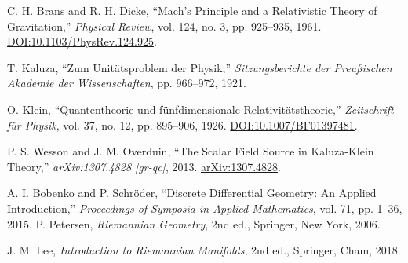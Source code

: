 \documentclass[twoside,twocolumn]{article}
\begin{document}
\begin{thebibliography}{99}
C. H. Brans and R. H. Dicke,
``Mach's Principle and a Relativistic Theory of Gravitation,''
\textit{Physical Review}, vol. 124, no. 3, pp. 925--935, 1961.
\href{https://doi.org/10.1103/PhysRev.124.925}{DOI:10.1103/PhysRev.124.925}.

T. Kaluza,
``Zum Unitätsproblem der Physik,''
\textit{Sitzungsberichte der Preußischen Akademie der Wissenschaften}, pp. 966--972, 1921.

O. Klein,
``Quantentheorie und fünfdimensionale Relativitätstheorie,''
\textit{Zeitschrift für Physik}, vol. 37, no. 12, pp. 895--906, 1926.
\href{https://doi.org/10.1007/BF01397481}{DOI:10.1007/BF01397481}.

P. S. Wesson and J. M. Overduin,
``The Scalar Field Source in Kaluza-Klein Theory,''
\textit{arXiv:1307.4828 [gr-qc]}, 2013.
\href{https://arxiv.org/abs/1307.4828}{arXiv:1307.4828}.

A. I. Bobenko and P. Schr\"oder, %
``Discrete Differential Geometry: An Applied Introduction,''
\textit{Proceedings of Symposia in Applied Mathematics}, vol. 71, pp. 1--36, 2015.
P. Petersen,
\textit{Riemannian Geometry}, 2nd ed.,
Springer, New York, 2006.

J. M. Lee,
\textit{Introduction to Riemannian Manifolds}, 2nd ed.,
Springer, Cham, 2018.



\end{thebibliography}
\end{document}
